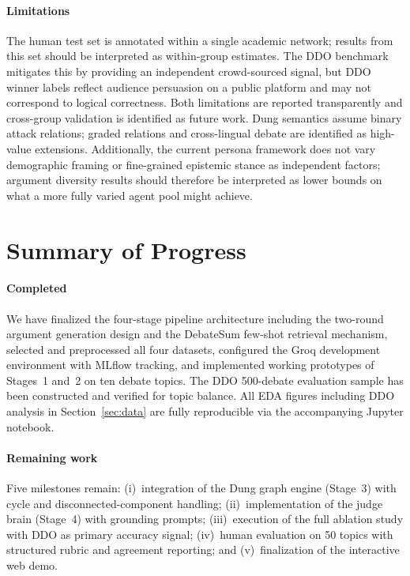 \documentclass[11pt,twocolumn,letterpaper]{article}
\newcommand{\DDOSample}{500}
\begin{document}
\paragraph{Limitations}
The human test set is annotated within a single academic network;
results from this set should be interpreted as within-group estimates.
The DDO benchmark mitigates this by providing an independent crowd-sourced
signal, but DDO winner labels reflect audience persuasion on a public
platform and may not correspond to logical correctness. Both limitations
are reported transparently and cross-group validation is identified as
future work. Dung semantics assume binary attack relations; graded
relations and cross-lingual debate are identified as high-value extensions.
Additionally, the current persona framework does not vary demographic
framing or fine-grained epistemic stance as independent factors; argument
diversity results should therefore be interpreted as lower bounds on what
a more fully varied agent pool might achieve.

\section{Summary of Progress}

\paragraph{Completed}
We have finalized the four-stage pipeline architecture including the
two-round argument generation design and the DebateSum few-shot retrieval
mechanism, selected and preprocessed all four datasets, configured the
Groq development environment with MLflow tracking, and implemented working prototypes of Stages~1 and~2 on ten debate
topics. The DDO \DDOSample-debate evaluation sample has been constructed
and verified for topic balance. All EDA figures including DDO analysis
in Section~\ref{sec:data} are fully reproducible via the accompanying
Jupyter notebook.

\paragraph{Remaining work}
Five milestones remain: (i)~integration of the Dung graph engine (Stage~3)
with cycle and disconnected-component handling; (ii)~implementation of the
judge brain (Stage~4) with grounding prompts; (iii)~execution of the full
ablation study with DDO as primary accuracy signal; (iv)~human evaluation
on 50 topics with structured rubric and agreement reporting; and
(v)~finalization of the interactive web demo.
\end{document}

